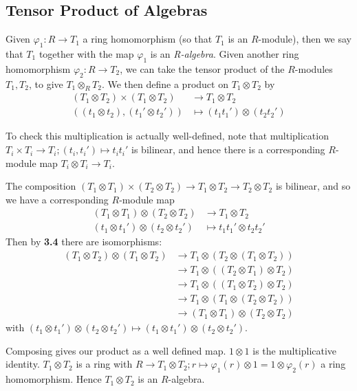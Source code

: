 \documentclass[10pt,a4paper]{article}
\begin{document}
\subsection{Tensor Product of Algebras}
\begin{definition}
  Given $\varphi_1:R \to T_1$ a ring homomorphism (so that $T_1$ is an $R$-module), then we say that $T_1$ together with the map $\varphi_1$ is an \emph{R-algebra}. Given another ring homomorphism $\varphi_2 : R \to T_2$, we can take the tensor product of the $R$-modules $T_1, T_2$, to give $T_1 \otimes_R T_2$. We then define a product on $T_1 \otimes T_2$ by
  \begin{align*}
    (T_1 \otimes T_2) \times (T_1 \otimes T_2) &\to T_1\otimes T_2\\
    ((t_1 \otimes t_2), (t_1'\otimes t_2')) &\mapsto (t_1t_1')\otimes (t_2t_2')
  \end{align*}
\end{definition}
To check this multiplication is actually well-defined, note that multiplication $T_i \times T_i \to T_i; (t_i, t_i') \mapsto t_it_i'$ is bilinear, and hence there is a corresponding $R$-module map $T_i \otimes T_i \to T_i$.

The composition $(T_1\otimes T_1)\times (T_2 \otimes T_2) \to T_1\otimes T_2 \to T_2\otimes T_2$ is bilinear, and so we have a corresponding $R$-module map
\begin{align*}
  (T_1 \otimes T_1) \otimes (T_2\otimes T_2) &\to T_1\otimes T_2\\
  (t_1\otimes t_1') \otimes (t_2\otimes t_2') &\mapsto t_1t_1'\otimes t_2t_2'
\end{align*}
Then by \textbf{3.4} there are isomorphisms:
\begin{align*}
  (T_1\otimes T_2)\otimes (T_1\otimes T_2) & \to T_1 \otimes (T_2 \otimes (T_1\otimes T_2))\\
  &\to T_1 \otimes ((T_2\otimes T_1)\otimes T_2)\\
  &\to T_1 \otimes ((T_1 \otimes T_2)\otimes T_2)\\
  &\to T_1\otimes (T_1\otimes (T_2\otimes T_2))\\
  &\to (T_1\otimes T_1)\otimes (T_2 \otimes T_2)
\end{align*}
with $(t_1\otimes t_1')\otimes (t_2\otimes t_2') \mapsto (t_1\otimes t_1')\otimes (t_2\otimes t_2')$.

Composing gives our product as a well defined map. $1\otimes 1$ is the multiplicative identity. $T_1 \otimes T_2$ is a ring with $R \to T_1\otimes T_2; r\mapsto \varphi_1(r)\otimes 1 = 1 \otimes \varphi_2(r)$ a ring homomorphism. Hence $T_1 \otimes T_2$ is an $R$-algebra.
\end{document}
